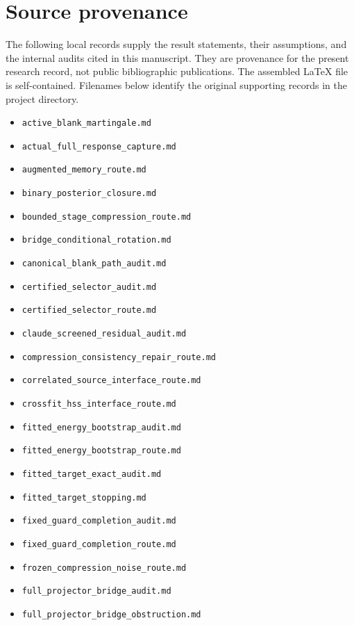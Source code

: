 \documentclass[11pt,oneside,openany,a4paper]{report}
\numberwithin{equation}{chapter}
\theoremstyle{definition}
\theoremstyle{remark}
\newcommand{\sourcefile}[1]{{\small\nolinkurl{#1}}}
\begin{document}
\appendix
\chapter{Source provenance}
The following local records supply the result statements, their assumptions,
and the internal audits cited in this manuscript. They are provenance for
the present research record, not public bibliographic publications.
The assembled LaTeX file is self-contained. Filenames below identify the
original supporting records in the project directory.

\begin{itemize}[leftmargin=1.3em,itemsep=1pt,topsep=3pt]
\item \sourcefile{active_blank_martingale.md}
\item \sourcefile{actual_full_response_capture.md}
\item \sourcefile{augmented_memory_route.md}
\item \sourcefile{binary_posterior_closure.md}
\item \sourcefile{bounded_stage_compression_route.md}
\item \sourcefile{bridge_conditional_rotation.md}
\item \sourcefile{canonical_blank_path_audit.md}
\item \sourcefile{certified_selector_audit.md}
\item \sourcefile{certified_selector_route.md}
\item \sourcefile{claude_screened_residual_audit.md}
\item \sourcefile{compression_consistency_repair_route.md}
\item \sourcefile{correlated_source_interface_route.md}
\item \sourcefile{crossfit_hss_interface_route.md}
\item \sourcefile{fitted_energy_bootstrap_audit.md}
\item \sourcefile{fitted_energy_bootstrap_route.md}
\item \sourcefile{fitted_target_exact_audit.md}
\item \sourcefile{fitted_target_stopping.md}
\item \sourcefile{fixed_guard_completion_audit.md}
\item \sourcefile{fixed_guard_completion_route.md}
\item \sourcefile{frozen_compression_noise_route.md}
\item \sourcefile{full_projector_bridge_audit.md}
\item \sourcefile{full_projector_bridge_obstruction.md}

\end{itemize}
\end{document}
